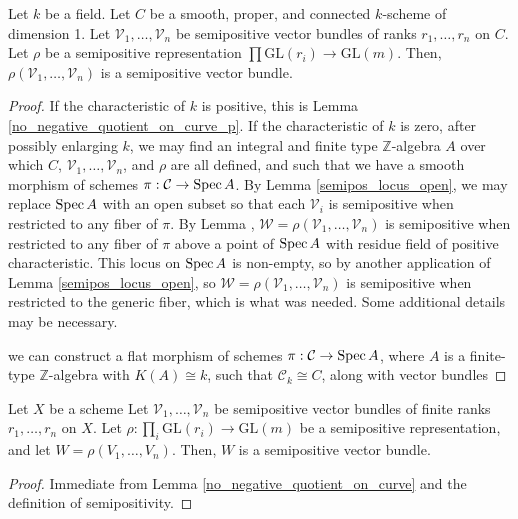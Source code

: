 \begin{lemma}\label{no_negative_quotient_on_curve}
Let $k$ be a field.
Let $C$ be a smooth, proper, and connected $k$-scheme of dimension 1.
Let $\mathcal{V}_1,\ldots,\mathcal{V}_n$ be semipositive vector bundles of ranks $r_1,\ldots,r_n$ on $C$.
Let $\rho$ be a semipositive representation $\prod \mathrm{GL}(r_i)\to \mathrm{GL}(m)$.
Then, $\rho(\mathcal{V}_1,\ldots,\mathcal{V}_n)$ is a semipositive vector bundle.
\end{lemma}
\begin{proof}
If the characteristic of $k$ is positive, this is Lemma \ref{no_negative_quotient_on_curve_p}.
If the characteristic of $k$ is zero, after possibly enlarging $k$, we may find an integral and finite type $\mathbb{Z}$-algebra $A$ over which $C$, $\mathcal{V}_1,\ldots,\mathcal{V}_n$, and $\rho$ are all defined, and such that we have a smooth morphism of schemes $\pi:\mathcal{C}\to\mathop{\rm Spec} A$.
By Lemma \ref{semipos_locus_open}, we may replace $\mathop{\rm Spec} A$ with an open subset so that each $\mathcal{V}_i$ is semipositive when restricted to any fiber of $\pi$.
By Lemma \label{no_negative_quotient_on_curve_p}, $\mathcal{W}=\rho(\mathcal{V}_1,\ldots,\mathcal{V}_n)$ is semipositive when restricted to any fiber of $\pi$ above a point of $\mathop{\rm Spec} A$ with residue field of positive characteristic.
This locus on $\mathop{\rm Spec} A$ is non-empty, so by another application of Lemma \ref{semipos_locus_open}, so $\mathcal{W}=\rho(\mathcal{V}_1,\ldots,\mathcal{V}_n)$ is semipositive when restricted to the generic fiber, which is what was needed.
Some additional details may be necessary.


 we can construct a flat morphism of schemes $\pi:\mathcal{C}\to\mathop{\rm Spec} A$, where $A$ is a finite-type $\mathbb{Z}$-algebra with $K(A)\cong k$, such that $\mathcal{C}_k\cong C$, along with vector bundles
\end{proof}


\begin{lemma}\label{apply_rho_still_semipos}
Let $X$ be a scheme
Let $\mathcal{V}_1,\ldots,\mathcal{V}_n$ be semipositive vector bundles of finite ranks $r_1,\ldots,r_n$ on $X$.
Let $\rho:\prod_i \mathrm{GL}(r_i)\to \mathrm{GL}(m)$ be a semipositive representation, and let $W=\rho(V_1,\ldots,V_n)$.
Then, $W$ is a semipositive vector bundle.
\end{lemma}

\begin{proof}
Immediate from Lemma \ref{no_negative_quotient_on_curve} and the definition of semipositivity.
\end{proof}



